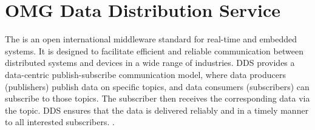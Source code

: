 \section{OMG Data Distribution Service}\label{c3_sec_dds}
The  is an open international middleware standard for real-time and embedded systems\cite{noauthor_data_nodate}. It is designed to facilitate efficient and reliable communication between distributed systems and devices in a wide range of industries.\newline 
DDS provides a data-centric publish-subscribe communication model, where data producers (publishers) publish data on specific topics, and data consumers (subscribers) can subscribe to those topics. The subscriber then receives the corresponding data via the topic. DDS ensures that the data is delivered reliably and in a timely manner to all interested subscribers. \cite{pardo-castellote_omg_2003, schlesselman_omg_2004}.

